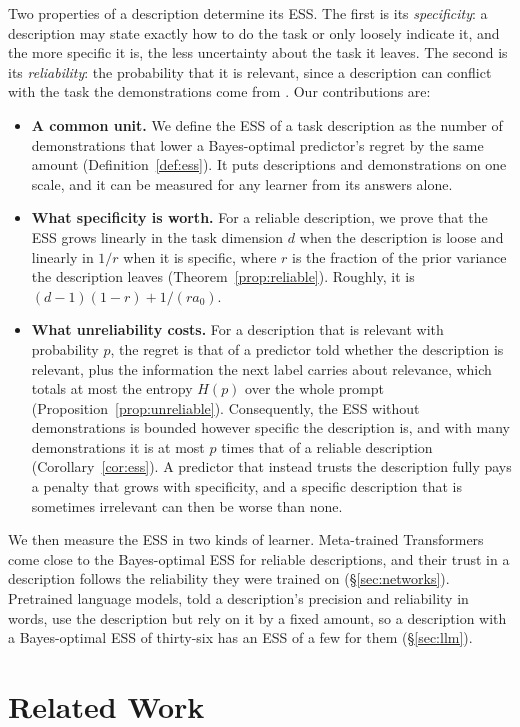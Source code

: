 \documentclass{article}
\begin{document}
Two properties of a description determine its ESS. The first is its \emph{specificity}: a description may state exactly how to do the task or only loosely indicate it, and the more specific it is, the less uncertainty about the task it leaves. The second is its \emph{reliability}: the probability that it is relevant, since a description can conflict with the task the demonstrations come from \citep{evans2006}. Our contributions are:
\begin{itemize}
    \item \textbf{A common unit.} We define the ESS of a task description as the number of demonstrations that lower a Bayes-optimal predictor's regret by the same amount (Definition~\ref{def:ess}). It puts descriptions and demonstrations on one scale, and it can be measured for any learner from its answers alone.
    \item \textbf{What specificity is worth.} For a reliable description, we prove that the ESS grows linearly in the task dimension $d$ when the description is loose and linearly in $1/r$ when it is specific, where $r$ is the fraction of the prior variance the description leaves (Theorem~\ref{prop:reliable}). Roughly, it is $(d-1)(1-r) + 1/(r a_0)$.
    \item \textbf{What unreliability costs.} For a description that is relevant with probability $p$, the regret is that of a predictor told whether the description is relevant, plus the information the next label carries about relevance, which totals at most the entropy $H(p)$ over the whole prompt (Proposition~\ref{prop:unreliable}). Consequently, the ESS without demonstrations is bounded however specific the description is, and with many demonstrations it is at most $p$ times that of a reliable description (Corollary~\ref{cor:ess}). A predictor that instead trusts the description fully pays a penalty that grows with specificity, and a specific description that is sometimes irrelevant can then be worse than none.
\end{itemize}
We then measure the ESS in two kinds of learner. Meta-trained Transformers come close to the Bayes-optimal ESS for reliable descriptions, and their trust in a description follows the reliability they were trained on (\S\ref{sec:networks}). Pretrained language models, told a description's precision and reliability in words, use the description but rely on it by a fixed amount, so a description with a Bayes-optimal ESS of thirty-six has an ESS of a few for them (\S\ref{sec:llm}).

\section{Related Work}
\end{document}
